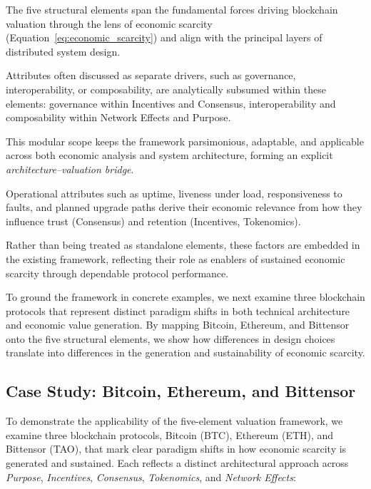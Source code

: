 \documentclass[12pt]{article}
\begin{document}
\begin{tcolorbox}[title=\textbf{Remark: Sufficiency and Modularity of the Five Elements}]
The five structural elements span the fundamental forces driving blockchain valuation through the lens of economic scarcity (Equation~\ref{eq:economic_scarcity}) and align with the principal layers of distributed system design.

Attributes often discussed as separate drivers, such as governance, interoperability, or composability, are analytically subsumed within these elements: governance within Incentives and Consensus, interoperability and composability within Network Effects and Purpose.

This modular scope keeps the framework parsimonious, adaptable, and applicable across both economic analysis and system architecture, forming an explicit \textit{architecture--valuation bridge}.
\end{tcolorbox}

\begin{tcolorbox}[title=\textbf{Remark: Operational Reliability and Downtime}]
Operational attributes such as uptime, liveness under load, responsiveness to faults, and planned upgrade paths derive their economic relevance from how they influence trust (Consensus) and retention (Incentives, Tokenomics).

Rather than being treated as standalone elements, these factors are embedded in the existing framework, reflecting their role as enablers of sustained economic scarcity through dependable protocol performance.
\end{tcolorbox}



To ground the framework in concrete examples, we next examine three blockchain protocols that represent distinct paradigm shifts in both technical architecture and economic value generation. By mapping Bitcoin, Ethereum, and Bittensor onto the five structural elements, we show how differences in design choices translate into differences in the generation and sustainability of economic scarcity.



\subsection{Case Study: Bitcoin, Ethereum, and Bittensor}
\label{subsec:five_element_case_study}

To demonstrate the applicability of the five-element valuation framework, we examine three blockchain protocols, Bitcoin (BTC), Ethereum (ETH), and Bittensor (TAO), that mark clear paradigm shifts in how economic scarcity is generated and sustained. Each reflects a distinct architectural approach across \textit{Purpose}, \textit{Incentives}, \textit{Consensus}, \textit{Tokenomics}, and \textit{Network Effects}:
\end{document}
